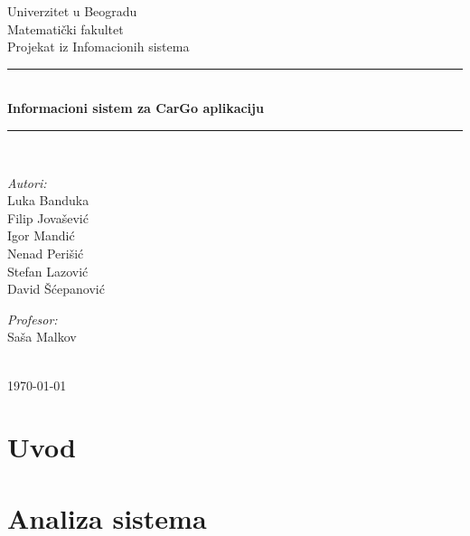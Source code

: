 \documentclass{article}
\begin{document}
\begin{titlepage}

\newcommand{\HRule}{\rule{\linewidth}{0.5mm}}
\center
\textup{\Large Univerzitet u Beogradu\\Matemati\v cki fakultet}\\[1.5cm]
\textup{\Large Projekat iz Infomacionih sistema}\\[0.4cm]

\HRule \\[0.4cm]
{ \huge \bfseries Informacioni sistem za CarGo aplikaciju}\\[0.4cm]
\HRule \\[8.5cm]

\begin{minipage}{0.4\textwidth}
\begin{flushleft}
\large
\emph{Autori:}\\
\textup Luka Banduka\\
\textup Filip Jovašević\\
\textup Igor Mandić\\
\textup Nenad Perišić\\
\textup Stefan Lazović\\
\textup David Šćepanović

\end{flushleft}
\end{minipage}
\hfill
\begin{minipage}{0.4\textwidth}
\begin{flushright}
\large
\emph{Profesor:} \\
\textup Saša Malkov\\
\end{flushright}
\end{minipage}\\[2cm]


{\textup \large \today}\\[1cm]

\end{titlepage}

\newpage
\tableofcontents

\newpage
\section{\bfseries Uvod}


\section{\bfseries Analiza sistema}
\end{document}
